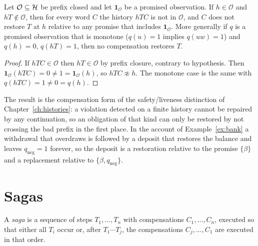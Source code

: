 \begin{newresult}\label{prop:irreversible}
Let $\mathcal O\subseteq\mathcal{H}$ be prefix closed and let $\mathbf 1_{\mathcal O}$ be a promised observation. If $h\in\mathcal O$ and $hT\notin\mathcal O$, then for every word $C$ the history $hTC$ is not in $\mathcal O$, and $C$ does not restore $T$ at $h$ relative to any promise that includes $\mathbf 1_{\mathcal O}$. More generally if $q$ is a promised observation that is monotone ($q(u)=1$ implies $q(uw)=1$) and $q(h)=0$, $q(hT)=1$, then no compensation restores $T$.
\end{newresult}
\begin{proof}
If $hTC\in\mathcal O$ then $hT\in\mathcal O$ by prefix closure, contrary to hypothesis. Then $\mathbf 1_{\mathcal O}(hTC)=0\ne1=\mathbf 1_{\mathcal O}(h)$, so $hTC\not\approx h$. The monotone case is the same with $q(hTC)=1\ne0=q(h)$.
\end{proof}

The result is the compensation form of the safety/liveness distinction of Chapter~\ref{ch:histories}: a violation detected on a finite history cannot be repaired by any continuation, so an obligation of that kind can only be restored by not crossing the bad prefix in the first place. In the account of Example~\ref{ex:bank} a withdrawal that overdraws is followed by a deposit that restores the balance and leaves $q_{\mathrm{neg}}=1$ forever, so the deposit is a restoration relative to the promise $\{\beta\}$ and a replacement relative to $\{\beta,q_{\mathrm{neg}}\}$.

\section{Sagas}

A \emph{saga} is a sequence of steps $T_1,\dots,T_n$ with compensations $C_1,\dots,C_n$, executed so that either all $T_i$ occur or, after $T_1\cdots T_j$, the compensations $C_j,\dots,C_1$ are executed in that order.

